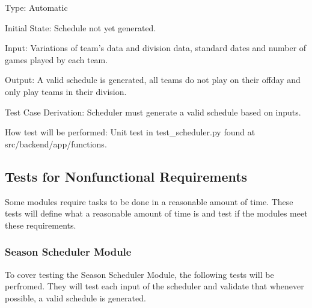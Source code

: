 \documentclass[12pt, titlepage]{article}
\begin{document}
\begin{enumerate}
Type: Automatic

Initial State: Schedule not yet generated.

Input: Variations of team's data and division data, standard dates and number
of games played by each team.

Output: A valid schedule is generated, all teams do not play on their offday
and only play teams in their division.

Test Case Derivation: Scheduler must generate a valid schedule based on
inputs.

How test will be performed: Unit test in test\_scheduler.py found at
src/backend/app/functions.

\end{enumerate}

\subsection{Tests for Nonfunctional Requirements}



Some modules require tasks to be done in a reasonable amount of time. These
tests will define what a reasonable amount of time is and test if the modules
meet these requirements.

\subsubsection{Season Scheduler Module}

To cover testing the Season Scheduler Module, the following tests will be
perfromed. They will test each input of the scheduler and validate that
whenever possible, a valid schedule is generated.
\end{document}
